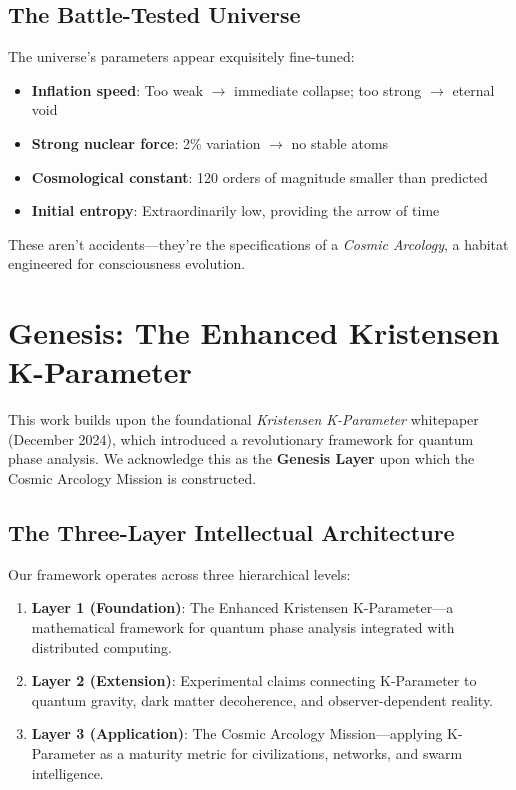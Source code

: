 \documentclass[12pt,a4paper]{article}
\begin{document}
\subsection{The Battle-Tested Universe}

The universe's parameters appear exquisitely fine-tuned:
\begin{itemize}
    \item \textbf{Inflation speed}: Too weak $\rightarrow$ immediate collapse; too strong $\rightarrow$ eternal void
    \item \textbf{Strong nuclear force}: 2\% variation $\rightarrow$ no stable atoms
    \item \textbf{Cosmological constant}: 120 orders of magnitude smaller than predicted
    \item \textbf{Initial entropy}: Extraordinarily low, providing the arrow of time
\end{itemize}

These aren't accidents---they're the specifications of a \textit{Cosmic Arcology}, a habitat
engineered for consciousness evolution.

\section{Genesis: The Enhanced Kristensen K-Parameter}

This work builds upon the foundational \textit{Kristensen K-Parameter} whitepaper (December 2024),
which introduced a revolutionary framework for quantum phase analysis. We acknowledge this
as the \textbf{Genesis Layer} upon which the Cosmic Arcology Mission is constructed.

\subsection{The Three-Layer Intellectual Architecture}

Our framework operates across three hierarchical levels:

\begin{enumerate}
    \item \textbf{Layer 1 (Foundation)}: The Enhanced Kristensen K-Parameter---a mathematical
          framework for quantum phase analysis integrated with distributed computing.
    \item \textbf{Layer 2 (Extension)}: Experimental claims connecting K-Parameter to
          quantum gravity, dark matter decoherence, and observer-dependent reality.
    \item \textbf{Layer 3 (Application)}: The Cosmic Arcology Mission---applying K-Parameter
          as a maturity metric for civilizations, networks, and swarm intelligence.
\end{enumerate}
\end{document}
